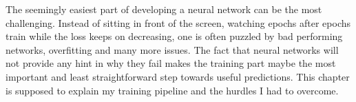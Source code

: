 The seemingly easiest part of developing a neural network can be the most challenging. Instead of sitting in front of the screen, watching epochs after epochs train while the loss keeps on decreasing, one is often puzzled by bad performing networks, overfitting and many more issues. The fact that neural networks will not provide any hint in why they fail makes the training part maybe the most important and least straightforward step towards useful predictions. This chapter is supposed to explain my training pipeline and the hurdles I had to overcome.